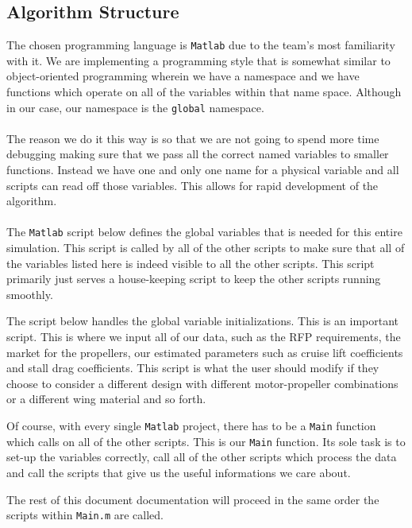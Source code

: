 \documentclass[letter, 12pt]{article}
\begin{document}
\begin{center}
\section{Algorithm Structure}
\begin{comment}
\end{comment}
The chosen programming language is \texttt{Matlab} due to the team's most familiarity with it. We are implementing a programming style that is somewhat similar to object-oriented programming wherein we have a namespace and we have functions which operate on all of the variables within that name space. Although in our case, our namespace is the \texttt{global} namespace.
\\~\\The reason we do it this way is so that we are not going to spend more time debugging making sure that we pass all the correct named variables to smaller functions. Instead we have one and only one name for a physical variable and all scripts can read off those variables. This allows for rapid development of the algorithm.
\\~\\The \texttt{Matlab} script below defines the global variables that is needed for this entire simulation. This script is called by all of the other scripts to make sure that all of the variables listed here is indeed visible to all the other scripts. This script primarily just serves a house-keeping script to keep the other scripts running smoothly.

$$$$
The script below handles the global variable initializations. This is an important script. This is where we input all of our data, such as the RFP requirements, the market for the propellers, our estimated parameters such as cruise lift coefficients and stall drag coefficients. This script is what the user should modify if they choose to consider a different design with different motor-propeller combinations or a different wing material and so forth.

$$$$
Of course, with every single \texttt{Matlab} project, there has to be a \texttt{Main} function which calls on all of the other scripts. This is our \texttt{Main} function. Its sole task is to set-up the variables correctly, call all of the other scripts which process the data and call the scripts that give us the useful informations we care about.

$$$$
The rest of this document documentation will proceed in the same order the scripts within \texttt{Main.m} are called.


\end{center}
\end{document}
